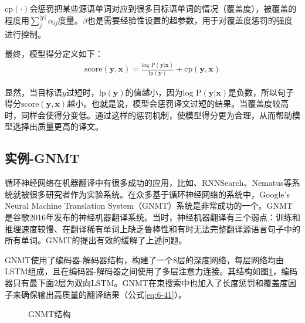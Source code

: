 \noindent $\textrm{cp}(\cdot)$会惩罚把某些源语单词对应到很多目标语单词的情况（覆盖度），被覆盖的程度用$\sum_j^{|\mathbf{y}|} \alpha_{ij}$度量。$\beta$也是需要经验性设置的超参数，用于对覆盖度惩罚的强度进行控制。

\parinterval 最终，模型得分定义如下：
\begin{eqnarray}
\textrm{score} ( \mathbf{y} , \mathbf{x}) = \frac{\textrm{log P}(\mathbf{y} | \mathbf{x})} {\textrm{lp}(\mathbf{y})} + \textrm{cp}(\mathbf{y} , \mathbf{x})
\label{eq:6-41}
\end{eqnarray}

\noindent 显然，当目标语$y$过短时，$\textrm{lp}(\mathbf{y})$的值越小，因为$\textrm{log P}(\mathbf{y} | \mathbf{x})$是负数，所以句子得分$\textrm{score} ( \mathbf{y} , \mathbf{x})$越小。也就是说，模型会惩罚译文过短的结果。当覆盖度较高时，同样会使得分变低。通过这样的惩罚机制，使模型得分更为合理，从而帮助模型选择出质量更高的译文。


\subsection{实例-GNMT}

\parinterval 循环神经网络在机器翻译中有很多成功的应用，比如、RNNSearch\cite{bahdanau2014neural}、Nematus\cite{DBLP:journals/corr/SennrichFCBHHJL17}等系统就被很多研究者作为实验系统。在众多基于循环神经网络的系统中，Google's Neural Machine Translation System（GNMT）系统是非常成功的一个\cite{Wu2016GooglesNM}。GNMT是谷歌2016年发布的神经机器翻译系统。当时，神经机器翻译有三个弱点：训练和推理速度较慢、在翻译稀有单词上缺乏鲁棒性和有时无法完整翻译源语言句子中的所有单词。GNMT的提出有效的缓解了上述问题。

\parinterval GNMT使用了编码器-解码器结构，构建了一个8层的深度网络，每层网络均由LSTM组成，且在编码器-解码器之间使用了多层注意力连接。其结构如图\ref{fig:6-35}，编码器只有最下面2层为双向LSTM。GNMT在束搜索中也加入了长度惩罚和覆盖度因子来确保输出高质量的翻译结果（公式\ref{eq:6-41}）。

\begin{figure}[htp]
\centering

\caption{GNMT结构}
\label{fig:6-35}
\end{figure}

